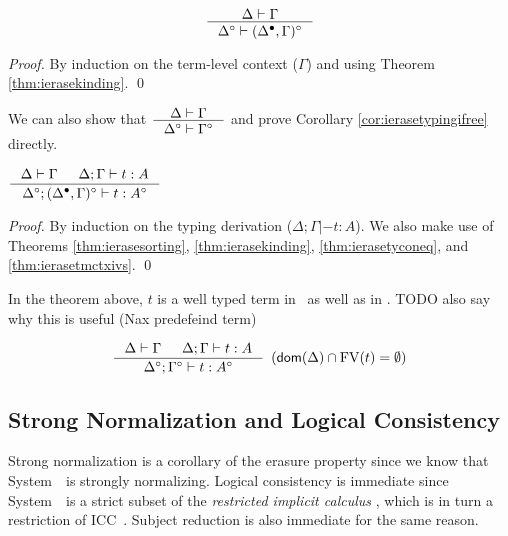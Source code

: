 \begin{theorem}
\label{thm:ierasetmctxivs}
\[ \inference{\Delta |- \Gamma}{\Delta^\circ |- (\Delta^\bullet,\Gamma)^\circ}
\]
\end{theorem}
\begin{proof}
	By induction on the term-level context ($\Gamma$)
	and using Theorem \ref{thm:ierasekinding}.
	\qed
\end{proof}
\begin{remark}
We can also show that
$\inference{\Delta |- \Gamma}{\Delta^\circ |- \Gamma^\circ}$
and prove Corollary \ref{cor:ierasetypingifree} directly.
\end{remark}

\begin{theorem}
\label{thm:ierasetypingall}
$ \inference{\Delta |- \Gamma & \Delta;\Gamma |- t : A}
                {\Delta^\circ;(\Delta^\bullet,\Gamma)^\circ |- t : A^\circ}
$
\end{theorem}
\begin{proof}
	By induction on the typing derivation ($\Delta;\Gamma |- t : A$).
	We also make use of Theorems
	\ref{thm:ierasesorting},
	\ref{thm:ierasekinding},
	\ref{thm:ierasetyconeq}, and
	\ref{thm:ierasetmctxivs}.
	\qed
\end{proof}
\begin{remark}
	In the theorem above, $t$ is a well typed term
	in \Fw\ as well as in \Fi.
	TODO also say why this is useful (Nax predefeind term)
\end{remark}

\begin{corollary}
\label{cor:ierasetypingifree}
\[ \inference{ \Delta |- \Gamma & \Delta;\Gamma |- t : A}
                {\Delta^\circ;\Gamma^\circ |- t : A^\circ}
                {\enspace(\dom(\Delta)\cap\FV(t) = \emptyset)}
\]
\end{corollary}

\subsection{Strong Normalization and Logical Consistency} \label{ssec:sn}
Strong normalization is a corollary of the erasure property since we know that
System~\Fw\ is strongly normalizing. Logical consistency is immediate since
System~\Fi\ is a strict subset of the \emph{restricted implicit calculus}
\cite{Miquel00}, which is in turn a restriction of ICC~\cite{Miquel01}.
Subject reduction is also immediate for the same reason.

